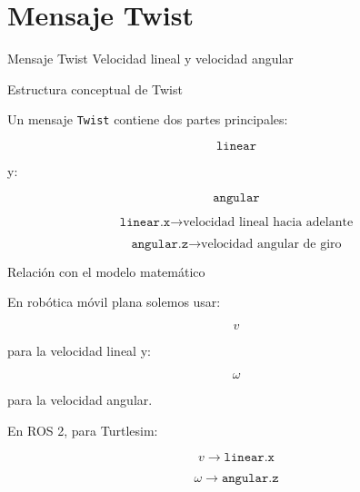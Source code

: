 \documentclass[aspectratio=169]{beamer}
\begin{document}
\section{Mensaje Twist}

\SectionSlide
{Mensaje Twist}
{Velocidad lineal y velocidad angular}

\begin{frame}{Estructura conceptual de Twist}

Un mensaje \texttt{Twist} contiene dos partes principales:

\[
\texttt{linear}
\]

y:

\[
\texttt{angular}
\]

\vspace{0.3cm}

\[
\texttt{linear.x}
\rightarrow
\text{velocidad lineal hacia adelante}
\]

\[
\texttt{angular.z}
\rightarrow
\text{velocidad angular de giro}
\]

\vspace{0.3cm}


\end{frame}

\begin{frame}{Relación con el modelo matemático}

En robótica móvil plana solemos usar:

\[
v
\]

para la velocidad lineal y:

\[
\omega
\]

para la velocidad angular.

En ROS 2, para Turtlesim:

\[
v
\longrightarrow
\texttt{linear.x}
\]

\[
\omega
\longrightarrow
\texttt{angular.z}
\]

\vspace{-0.3cm}


\end{frame}
\end{document}
